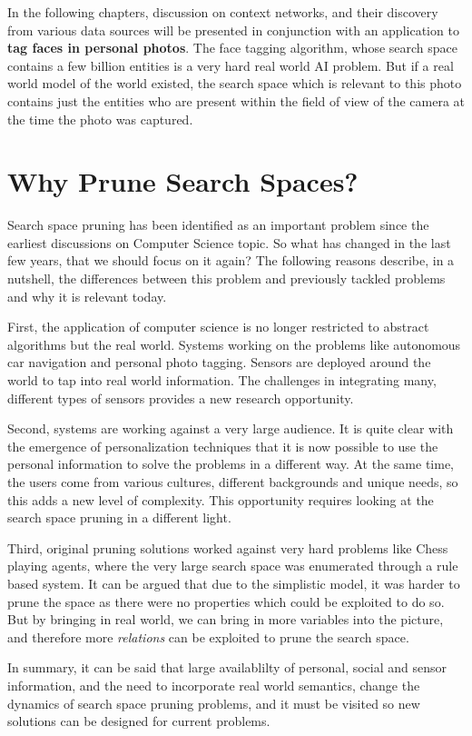 In the following chapters, discussion on context networks, and their discovery from various data sources will be presented in conjunction with an application to \textbf{tag faces in personal photos}. The face tagging algorithm, whose search space contains a few billion entities is a very hard real world AI problem. But if a real world model of the world existed, the search space which is relevant to this photo contains just the entities who are present within the field of view of the camera at the time the photo was captured. 

\section{Why Prune Search Spaces?}
Search space pruning has been identified as an important problem since the earliest discussions on Computer Science topic. So what has changed in the last few years, that we should focus on it again? The following reasons describe, in a nutshell, the differences between this problem and previously tackled problems and why it is relevant today.

First, the application of computer science is no longer restricted to abstract algorithms but the real world. Systems working on the problems like autonomous car navigation and personal photo tagging. Sensors are deployed around the world to tap into real world information. The challenges in integrating many, different types of sensors provides a new research opportunity.

Second, systems are working against a very large audience. It is quite clear with the emergence of personalization techniques that it is now possible to use the personal information to solve the problems in a different way. At the same time, the users come from various cultures, different backgrounds and unique needs, so this adds a new level of complexity. This opportunity requires looking at the search space pruning in a different light.

Third, original pruning solutions worked against very hard problems like Chess playing agents, where the very large search space was enumerated through a rule based system. It can be argued that due to the simplistic model, it was harder to prune the space as there were no properties which could be exploited to do so. But by bringing in real world, we can bring in more variables into the picture, and therefore more \textit{relations} can be exploited to prune the search space.

In summary, it can be said that large availablilty of personal, social and sensor information, and the need to incorporate real world semantics, change the dynamics of search space pruning problems, and it must be visited so new solutions can be designed for current problems.

